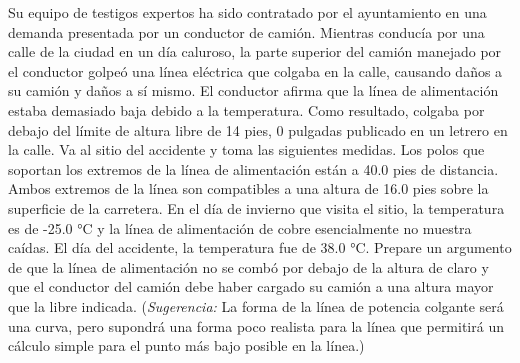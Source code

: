 \item Su equipo de testigos expertos ha sido contratado por el ayuntamiento en una demanda presentada por un conductor de camión. Mientras conducía por una calle de la ciudad en un día caluroso, la parte superior del camión manejado por el conductor golpeó una línea eléctrica que colgaba en la calle, causando daños a su camión y daños a sí mismo. El conductor afirma que la línea de alimentación estaba demasiado baja debido a la temperatura. Como resultado, colgaba por debajo del límite de altura libre de 14 pies, 0 pulgadas publicado en un letrero en la calle. Va al sitio del accidente y toma las siguientes medidas. Los polos que soportan los extremos de la línea de alimentación están a 40.0 pies de distancia. Ambos extremos de la línea son compatibles a una altura de 16.0 pies sobre la superficie de la carretera. En el día de invierno que visita el sitio, la temperatura es de -25.0 °C y la línea de alimentación de cobre esencialmente no muestra caídas. El día del accidente, la temperatura fue de 38.0 °C. Prepare un argumento de que la línea de alimentación no se combó por debajo de la altura de claro y que el conductor del camión debe haber cargado su camión a una altura mayor que la libre indicada. (\textit{Sugerencia:} La forma de la línea de potencia colgante será una curva, pero supondrá una forma poco realista para la línea que permitirá un cálculo simple para el punto más bajo posible en la línea.)
